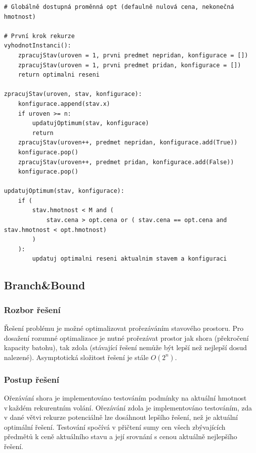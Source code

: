 \documentclass[12pt]{article}
\begin{document}
\begin{listing}[ht]
    \begin{verbatim}
# Globálně dostupná proměnná opt (defaulně nulová cena, nekonečná hmotnost)

# První krok rekurze 
vyhodnotInstanci():
    zpracujStav(uroven = 1, prvni predmet nepridan, konfigurace = [])
    zpracujStav(uroven = 1, prvni predmet pridan, konfigurace = []) 
    return optimalni reseni
 
zpracujStav(uroven, stav, konfigurace): 
    konfigurace.append(stav.x)
    if uroven >= n: 
        updatujOptimum(stav, konfigurace) 
        return 
    zpracujStav(uroven++, predmet nepridan, konfigurace.add(True))
    konfigurace.pop()
    zpracujStav(uroven++, predmet pridan, konfigurace.add(False))
    konfigurace.pop()

updatujOptimum(stav, konfigurace): 
    if (
        stav.hmotnost < M and (
            stav.cena > opt.cena or ( stav.cena == opt.cena and stav.hmotnost < opt.hmotnost)
        )
    ):
        updatuj optimalni reseni aktualnim stavem a konfiguraci
    \end{verbatim}
\end{listing}

\subsection{Branch\&Bound}

\subsubsection{Rozbor řešení}

Řešení problému je možné optimalizovat prořezáváním stavového prostoru. Pro dosažení rozumné optimalizace je nutné prořezávat prostor jak shora (překročení kapacity batohu), tak zdola (stávající řešení nemůže být lepší než nejlepší dosud nalezené). Asymptotická složitost řešení je stále $O(2^n)$.

\subsubsection{Postup řešení}

Ořezávání shora je implementováno testováním podmínky na aktuální hmotnost v každém rekurentním volání. Ořezávání zdola je implementováno testováním, zda v dané větvi rekurze potenciálně lze dosáhnout lepšího řešení, než je aktuální optimální řešení. Testování spočívá v přičtení sumy cen všech zbývajících předmětů k ceně aktuálního stavu a její srovnání s cenou aktuálně nejlepšího řešení.
\end{document}
